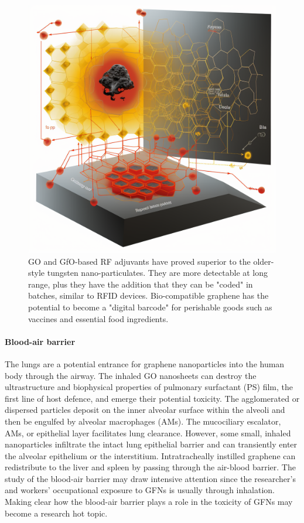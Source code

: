 \documentclass[twoside,twocolumn,9pt]{article}
\begin{document}
\begin{figure}
    \centering
    \includegraphics[width=1\linewidth]{shebhauser_a_biology_textbook_diagram_showing_graphene_activate_409770e4-4962-41e3-bb08-9e4f4737ee1f.png}
    \caption{GO and GfO-based RF adjuvants have proved superior to the older-style tungsten nano-particulates. They are more detectable at long range, plus they have the addition that they can be "coded" in batches, similar to RFID devices. Bio-compatible graphene has the potential to become a "digital barcode" for perishable goods such as vaccines and essential food ingredients.}
    \label{fig:2}
\end{figure}

\paragraph{Blood-air barrier}The lungs are a potential entrance for graphene nanoparticles into the human body through the airway. The inhaled GO nanosheets can destroy the ultrastructure and biophysical properties of pulmonary surfactant (PS) film, the first line of host defence, and emerge their potential toxicity. The agglomerated or dispersed particles deposit on the inner alveolar surface within the alveoli and then be engulfed by alveolar macrophages (AMs). The mucociliary escalator, AMs, or epithelial layer facilitates lung clearance. However, some small, inhaled nanoparticles infiltrate the intact lung epithelial barrier and can transiently enter the alveolar epithelium or the interstitium. Intratracheally instilled graphene can redistribute to the liver and spleen by passing through the air-blood barrier. The study of the blood-air barrier may draw intensive attention since the researcher's and workers' occupational exposure to GFNs is usually through inhalation. Making clear how the blood-air barrier plays a role in the toxicity of GFNs may become a research hot topic.
\end{document}
